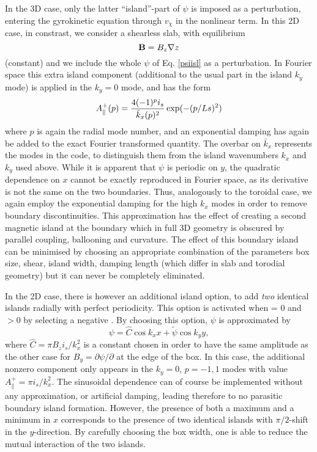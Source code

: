 In the 3D case, only the latter ``island''-part of $\psi$ is imposed as a
perturbation, entering the gyrokinetic equation through $v_\chi$ in the nonlinear term. 
In this 2D case, in constrast, we consider a shearless slab, with equilibrium 
\begin{equation}
{\bf B}= B_z \nabla z
\end{equation}
(constant) and we include the whole $\psi$ of Eq. \ref{psiisl}
as a perturbation. In Fourier space this extra island component
(additional to the usual part in the island $k_y$ mode)
is applied in the $k_y=0$ mode, and has the form 
\begin{equation}
A_\parallel^+(p) =  {4 (-1)^p i_s \over {\bar k}_x(p)^2 } \exp(-(p/Ls)^2)
\end{equation} 
where $p$ is again the radial mode number, and an exponential damping has again 
be added to the exact Fourier transformed quantity. The overbar on ${\bar k}_x$
represents the modes in the code, to distinguish them from the island wavenumbers $k_x$ and $k_y$
used above.  While it is apparent that $\psi$ is periodic on $y$, the
quadratic dependence on $x$ cannot be exactly reproduced in Fourier space, as
its derivative is not the same on the two boundaries. Thus, analogously to
the toroidal case, we again employ the exponential damping for the high $k_x$ modes in
order to remove boundary discontinuities.  This approximation has the effect of creating a second
magnetic island at the boundary which in full 3D geometry is obscured by parallel coupling, ballooning
and curvature. The effect of this boundary island can be minimised by 
choosing an appropriate combination of the parameters box size, shear, island width, damping length
(which differ in slab and torodial geometry) but it can never be completely eliminated.

In the 2D case, there is however an additional island option, to add \textit{two}
identical islands radially with perfect periodicity.  This option is activated
when  = 0 and  $> 0$ by selecting a
negative . By choosing this option,  $\psi$ is
approximated by 
\begin{equation}
\psi = {\hat C}\cos{k_x x}+\tilde{\psi}\cos{k_y y},
\end{equation}
where $\hat{C}= \pi B_z i_s/ k_x^2$ is a constant chosen in order to have the
same amplitude as the other case for $B_y= \partial \psi/\partial$ at the edge
of the box. In this case, the additional nonzero component only appears in the $k_y=0$, $p= -1,1$ modes
with value $A_\parallel^+ = \pi i_s / k_x^2$.  The sinusoidal dependence can of course be implemented without any
approximation, or artificial damping, leading therefore to no parasitic boundary island
formation. However, the presence of both a maximum and a minimum in $x$
corresponds to the presence of two identical islands with $\pi/2$-shift in the
$y$-direction. By carefully choosing the box width, one is able to reduce the
mutual interaction of the two islands. 


